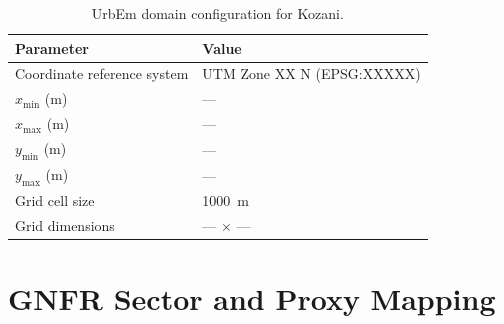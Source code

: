 \begin{table}[h]
  \centering
  \caption{UrbEm domain configuration for Kozani.}
  \label{tab:domain_kozani}
  \begin{tabular}{ll}
    \toprule
    \textbf{Parameter}          & \textbf{Value} \\
    \midrule
    Coordinate reference system & UTM Zone XX N (EPSG:XXXXX) \\
    $x_{\min}$ (m)              & --- \\
    $x_{\max}$ (m)              & --- \\
    $y_{\min}$ (m)              & --- \\
    $y_{\max}$ (m)              & --- \\
    Grid cell size              & \SI{1000}{\metre} \\
    Grid dimensions             & --- $\times$ --- \\
    \bottomrule
  \end{tabular}
\end{table}

\section{GNFR Sector and Proxy Mapping}
\label{app:gnfr_proxy}

